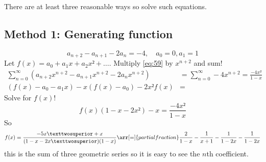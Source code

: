 \documentclass[english]{lbscript}
\begin{document}
There are at least three reasonable ways so solve such equations.


\subsection{Method 1: Generating function}
\label{sec:method-1:-generating}
\begin{example}{}{}
\begin{equation}
\label{eq:59}
a_{n+2} - a_{n+1} - 2a_n = -4, \quad a_0=0, a_1=1
\end{equation}
Let \(f(x)=a_0+a_1x+a_2x²+\dots\). Multiply \cref{eq:59} by \(x^{n+2}\) and sum!
\begin{align}
\label{eq:54}
∑_{n=0}^{∞} \left( a_{n+2}x^{n+2} - a_{n+1} x^{n+2} - 2a_n x^{n+2} \right)
&= ∑_{n=0}^{∞} -4 x^{n+2}
= \frac{-4x²}{1-x}\\
 \left(f(x) - a_0 - a_1x \right) - x\left(f(x) - a_0 \right) - 2x²f(x) &=
\end{align}
Solve for \(f(x)\)!
\begin{equation}
\label{eq:60}
f(x) \left(1-x-2x² \right)  - x = \frac{-4x²}{1-x}
\end{equation}
So
\begin{equation}
\label{eq:61}
f(x) = \frac{-5x²+x}{(1-x-2x²)(1-x)} \arr[=]{partial fraction} \frac{2}{1-x} - \frac{1}{x+1} - \frac{1}{1-2x} - \frac{1}{1-2x}
\end{equation}
this is the sum of three geometric series so it is easy to see the \(n\)th coefficient.
\end{example}
\end{document}
